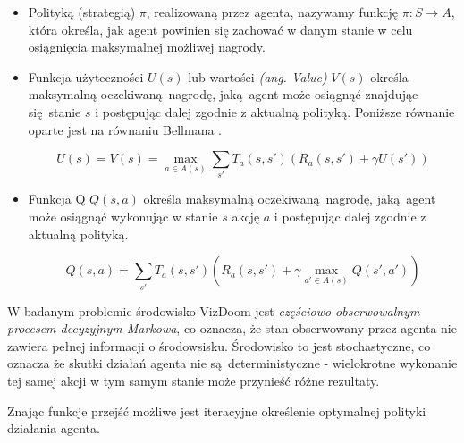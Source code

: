 \begin{itemize}
\item Polityką (strategią) $\pi$, realizowaną przez agenta, nazywamy funkcję $ \pi: S \rightarrow A$, która określa, jak agent powinien się zachować w danym stanie w celu osiągnięcia maksymalnej możliwej nagrody.
\item Funkcja użyteczności $U(s)$ lub wartości \textit{(ang. Value)} $V(s)$ określa maksymalną oczekiwaną nagrodę, jaką agent może osiągnąć znajdując się stanie $s$ i postępując dalej zgodnie z aktualną polityką. Poniższe równanie oparte jest na równaniu Bellmana \cite{bellman1954}.

$$U(s) = V(s) = \max_{a \in A(s)} \sum_{s'} T_a(s,s')(R_a(s,s') + \gamma U(s'))$$
\item Funkcja Q $Q(s,a)$ określa maksymalną oczekiwaną nagrodę, jaką agent może osiągnąć wykonując w stanie $s$ akcję $a$ i postępując dalej zgodnie z aktualną polityką.

$$Q(s,a) = \sum_{s'} T_a(s,s')(R_a(s,s') + \gamma \max_{a' \in A(s)}Q(s',a'))$$

\end{itemize}

\vspace{5mm}

W badanym problemie środowisko VizDoom jest \textit{częściowo obserwowalnym procesem decyzyjnym Markowa}, co oznacza, że stan obserwowany przez agenta nie zawiera pełnej informacji o środowsisku. Środowisko to jest stochastyczne, co oznacza że skutki działań agenta nie są deterministyczne - wielokrotne wykonanie tej samej akcji w tym samym stanie może przynieść różne rezultaty.

Znając funkcje przejść możliwe jest iteracyjne określenie optymalnej polityki działania agenta. 


